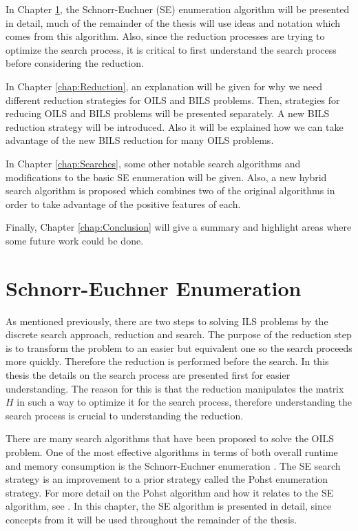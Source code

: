 \documentclass[12pt,Bold,letterpaper]{mcgilletdclass}
\begin{document}
In Chapter \ref{chap:SESearch}, the Schnorr-Euchner (SE) enumeration algorithm \cite{SchE94} will be presented in detail, much of the remainder of the thesis will use ideas and notation which comes from this algorithm. Also, since the reduction processes are trying to optimize the search process, it is critical to first understand the search process before considering the reduction.

In Chapter \ref{chap:Reduction}, an explanation will be given for why we need different reduction strategies for OILS and BILS problems. Then, strategies for reducing OILS and BILS problems will be presented separately. A new BILS reduction strategy will be introduced. Also it will be explained how we can take advantage of the new BILS reduction for many OILS problems.

In Chapter \ref{chap:Searches}, some other notable search algorithms and modifications to the basic SE enumeration will be given. Also, a new hybrid search algorithm is proposed which combines two of the original algorithms in order to take advantage of the positive features of each.

Finally, Chapter \ref{chap:Conclusion} will give a summary and highlight areas where some future work could be done.

\chapter{Schnorr-Euchner Enumeration} \label{chap:SESearch}

As mentioned previously, there are two steps to solving ILS problems by the discrete search approach, reduction and search. The purpose of the reduction step is to transform the problem to an easier but equivalent one so the search proceeds more quickly. Therefore the reduction is performed before the search. In this thesis the details on the search process are presented first for easier understanding. The reason for this is that the reduction manipulates the matrix $H$ in such a way to optimize it for the search process, therefore understanding the search process is crucial to understanding the reduction.

There are many search algorithms that have been proposed to solve the OILS problem. One of the most effective algorithms in terms of both overall runtime and memory consumption is the Schnorr-Euchner enumeration \cite{SchE94}. The SE search strategy is an improvement to a prior strategy called the Pohst enumeration strategy. For more detail on the Pohst algorithm and how it relates to the SE algorithm, see \cite{AgrEVZ02}. In this chapter, the SE algorithm is presented in detail, since concepts from it will be used throughout the remainder of the thesis.
\end{document}
